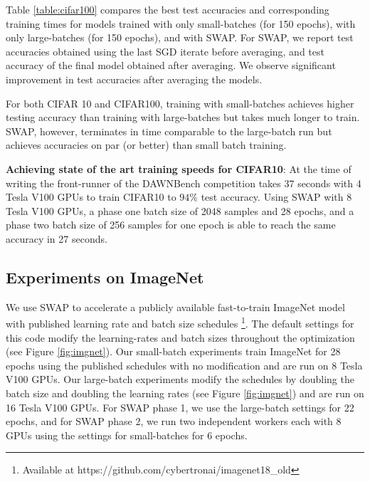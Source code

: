 \documentclass{article} %
\begin{document}
Table \ref{table:cifar100} compares the best test accuracies and corresponding
training times for models trained with only small-batches (for 150 epochs),
with only large-batches (for 150 epochs), and with SWAP. For SWAP, we report
test accuracies obtained using the last SGD iterate before averaging, and
test accuracy of the final model obtained after averaging. We observe significant
improvement in test accuracies after averaging the models.

 For both CIFAR 10 and CIFAR100, training with small-batches achieves higher
 testing accuracy than training with large-batches but takes much longer
 to train. SWAP, however, terminates in time comparable
 to the large-batch run but achieves accuracies on par (or better) than small
 batch training.

\textbf{Achieving state of the art training speeds for CIFAR10}: 
At the time of writing the front-runner of the DAWNBench competition 
takes 37 seconds with 4 Tesla V100 GPUs to train CIFAR10 to $94\%$ test accuracy.
Using SWAP with 8 Tesla V100 GPUs, 
a phase one batch size of 2048 samples and 28 epochs, and a phase two batch size 
of 256 samples for one epoch is able to reach the same accuracy in 27 seconds.

\subsection{Experiments on ImageNet}

We use SWAP to accelerate a publicly available fast-to-train ImageNet model
with published learning rate and batch size schedules \footnote{Available at
https://github.com/cybertronai/imagenet18\_old}. The default settings for this
code modify the learning-rates and batch sizes throughout the optimization (see
Figure \ref{fig:imgnet}). Our small-batch experiments train ImageNet for 28 epochs using
the published schedules with no modification and are run on 8 Tesla V100 GPUs.
Our large-batch experiments modify the schedules by doubling the batch size and
doubling the learning rates (see Figure \ref{fig:imgnet}) and are run on 16
Tesla V100 GPUs. For SWAP phase 1, we use the large-batch settings for 22
epochs, and for SWAP phase 2, we run two independent workers each with 8 GPUs using
the settings for small-batches for 6 epochs. 
\end{document}
